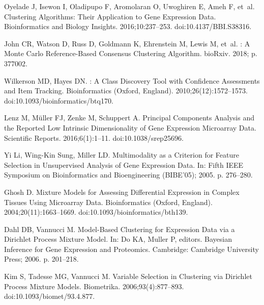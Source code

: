 \documentclass[10pt,letterpaper]{article}
\begin{document}
\begin{thebibliography}{10}
Oyelade J, Isewon I, Oladipupo F, Aromolaran O, Uwoghiren E, Ameh F, et~al.
\newblock Clustering {{Algorithms}}: {{Their Application}} to {{Gene Expression
		Data}}.
\newblock Bioinformatics and Biology Insights. 2016;10:237--253.
\newblock doi:{10.4137/BBI.S38316}.

John CR, Watson D, Russ D, Goldmann K, Ehrenstein M, Lewis M, et~al.
: {{A Monte Carlo}} Reference-Based Consensus Clustering
Algorithm.
\newblock bioRxiv. 2018; p. 377002.

Wilkerson MD, Hayes DN.
: A Class Discovery Tool with Confidence
Assessments and Item Tracking.
\newblock Bioinformatics (Oxford, England). 2010;26(12):1572--1573.
\newblock doi:{10.1093/bioinformatics/btq170}.

Lenz M, M{\"u}ller FJ, Zenke M, Schuppert A.
\newblock Principal Components Analysis and the Reported Low Intrinsic
Dimensionality of Gene Expression Microarray Data.
\newblock Scientific Reports. 2016;6(1):1--11.
\newblock doi:{10.1038/srep25696}.

{Yi Li}, {Wing-Kin Sung}, Miller LD.
\newblock Multimodality as a Criterion for Feature Selection in Unsupervised
Analysis of Gene Expression Data.
\newblock In: Fifth {{IEEE Symposium}} on {{Bioinformatics}} and
{{Bioengineering}} ({{BIBE}}'05); 2005. p. 276--280.

Ghosh D.
\newblock Mixture Models for Assessing Differential Expression in Complex
Tissues Using Microarray Data.
\newblock Bioinformatics (Oxford, England). 2004;20(11):1663--1669.
\newblock doi:{10.1093/bioinformatics/bth139}.

Dahl DB, Vannucci M.
\newblock Model-{{Based Clustering}} for {{Expression Data}} via a {{Dirichlet
		Process Mixture Model}}.
\newblock In: Do KA, Muller P, editors. Bayesian {{Inference}} for {{Gene
		Expression}} and {{Proteomics}}. {Cambridge}: {Cambridge University Press};
2006. p. 201--218.

Kim S, Tadesse MG, Vannucci M.
\newblock Variable Selection in Clustering via {{Dirichlet}} Process Mixture
Models.
\newblock Biometrika. 2006;93(4):877--893.
\newblock doi:{10.1093/biomet/93.4.877}.


\end{thebibliography}
\end{document}
